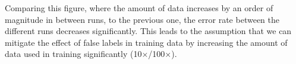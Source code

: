 \documentclass[a4paper,11pt]{scrartcl}
\theoremstyle{definition}
\begin{document}
Comparing this figure, where the amount of data increases by an order of magnitude in between runs, to the previous one, the error rate between the different runs decreases significantly. This leads to the assumption that we can mitigate the effect of false labels in training data by increasing the amount of data used in training significantly (10$\times$/100$\times$).

\end{document}
